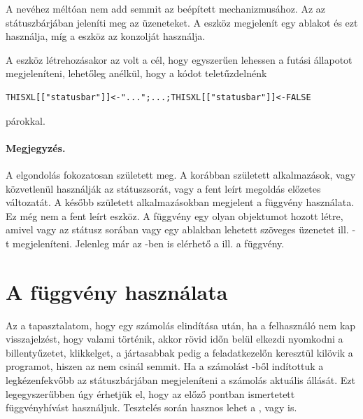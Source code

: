 A  nevéhez méltóan nem add semmit az  beépített
mechanizmusához. Az 
  az  státuszbárjában jeleníti
meg az üzeneteket. A  eszköz megjelenít egy ablakot és ezt
használja, míg a  eszköz az  konzolját használja. 

A  eszköz létrehozásakor az volt a cél, hogy
egyszerűen lehessen a futási 
állapotot megjeleníteni, lehetőleg anélkül, hogy a kódot teletűzdelnénk
\begin{verbatim}
THISXL[["statusbar"]]<-"...";...;THISXL[["statusbar"]]<-FALSE
\end{verbatim}
párokkal. %

\paragraph{Megjegyzés.} A  elgondolás fokozatosan
született meg. A korábban született alkalmazások, vagy közvetlenül
használják az  státuszsorát, vagy a fent leírt megoldás 
előzetes változatát. A később született alkalmazásokban megjelent a
 függvény használata. Ez még nem a fent leírt 
eszköz. A  függvény egy olyan objektumot hozott 
létre, amivel vagy az  státusz sorában vagy egy 
ablakban lehetett szöveges üzenetet 
ill. -t megjeleníteni. Jelenleg már az -ben
is elérhető a  ill. a 
 függvény.



\section{A  függvény használata}\label{sec:4.5}

Az a tapasztalatom, hogy egy számolás elindítása után, ha a
felhasználó nem kap visszajelzést, hogy valami történik, akkor rövid
időn belül elkezdi nyomkodni a billentyűzetet, klikkelget, a
jártasabbak pedig a feladatkezelőn keresztül kilövik a programot,
hiszen az nem csinál semmit. Ha a számolást -ből
indítottuk a legkézenfekvőbb az  státuszbárjában
megjeleníteni a számolás aktuális állását. Ezt legegyszerűbben úgy
érhetjük el, hogy 
az előző pontban ismertetett  függvényhívást
használjuk. Tesztelés során 
hasznos lehet a , vagy  is.

